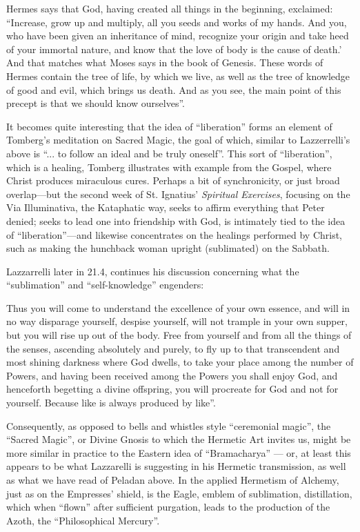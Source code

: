 \begin{quotex}
Hermes says that God, having created all things in the beginning, exclaimed: ``Increase, grow up and multiply, all you seeds and works of my hands. And you, who have been given an inheritance of mind, recognize your origin and take heed of your immortal nature, and know that the love of body is the cause of death.' And that matches what Moses says in the book of Genesis. These words of Hermes contain the tree of life, by which we live, as well as the tree of knowledge of good and evil, which brings us death. And as you see, the main point of this precept is that we should know ourselves''.
\end{quotex}


It becomes quite interesting that the idea of ``liberation'' forms an element of Tomberg's meditation on Sacred Magic, the goal of which, similar to Lazzerrelli's above is ``... to follow an ideal and be truly oneself''. This sort of ``liberation'', which is a healing, Tomberg illustrates with example from the Gospel, where Christ produces miraculous cures. Perhaps a bit of synchronicity, or just broad overlap---but the second week of St. Ignatius' \textit{Spiritual Exercises}, focusing on the Via Illuminativa, the Kataphatic way, seeks to affirm everything that Peter denied; seeks to lead one into friendship with God, is intimately tied to the idea of ``liberation''---and likewise concentrates on the healings performed by Christ, such as making the hunchback woman upright (sublimated) on the Sabbath.

Lazzarrelli later in 21.4, continues his discussion concerning what the ``sublimation'' and ``self-knowledge'' engenders:

\begin{quotex}
Thus you will come to understand the excellence of your own essence, and will in no way disparage yourself, despise yourself, will not trample in your own supper, but you will rise up out of the body. Free from yourself and from all the things of the senses, ascending absolutely and purely, to fly up to that transcendent and most shining darkness where God dwells, to take your place among the number of Powers, and having been received among the Powers you shall enjoy God, and henceforth begetting a divine offspring, you will procreate for God and not for yourself. Because like is always produced by like''.
\end{quotex}


Consequently, as opposed to bells and whistles style ``ceremonial magic'', the ``Sacred Magic'', or Divine Gnosis to which the Hermetic Art invites us, might be more similar in practice to the Eastern idea of ``Bramacharya'' --- or, at least this appears to be what Lazzarelli is suggesting in his Hermetic transmission, as well as what we have read of Peladan above. In the applied Hermetism of Alchemy, just as on the Empresses' shield, is the Eagle, emblem of sublimation, distillation, which when ``flown'' after sufficient purgation, leads to the production of the Azoth, the ``Philosophical Mercury''.


